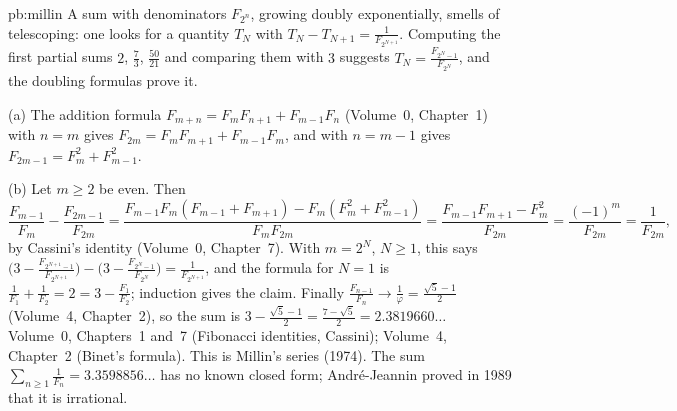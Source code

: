 \begin{solution}{pb:millin}
\idea A sum with denominators $F_{2^n}$, growing doubly exponentially, smells of telescoping: one looks for a quantity $T_N$
with $T_N-T_{N+1}=\frac1{F_{2^{N+1}}}$. Computing the first partial sums $2$, $\frac73$, $\frac{50}{21}$ and comparing them
with $3$ suggests $T_N=\frac{F_{2^N-1}}{F_{2^N}}$, and the doubling formulas prove it.

\writeup (a) The addition formula $F_{m+n}=F_mF_{n+1}+F_{m-1}F_n$ (Volume~0, Chapter~1) with $n=m$ gives
$F_{2m}=F_mF_{m+1}+F_{m-1}F_m$, and with $n=m-1$ gives $F_{2m-1}=F_m^2+F_{m-1}^2$.

(b) Let $m\ge2$ be even. Then
\[
\frac{F_{m-1}}{F_m}-\frac{F_{2m-1}}{F_{2m}}=\frac{F_{m-1}F_m(F_{m-1}+F_{m+1})-F_m(F_m^2+F_{m-1}^2)}{F_mF_{2m}}
=\frac{F_{m-1}F_{m+1}-F_m^2}{F_{2m}}=\frac{(-1)^m}{F_{2m}}=\frac1{F_{2m}},
\]
by Cassini's identity (Volume~0, Chapter~7). With $m=2^N$, $N\ge1$, this says $\bigl(3-\frac{F_{2^{N+1}-1}}{F_{2^{N+1}}}\bigr)-
\bigl(3-\frac{F_{2^N-1}}{F_{2^N}}\bigr)=\frac1{F_{2^{N+1}}}$, and the formula for $N=1$ is
$\frac1{F_1}+\frac1{F_2}=2=3-\frac{F_1}{F_2}$; induction gives the claim. Finally $\frac{F_{n-1}}{F_n}\to\frac1\varphi=
\frac{\sqrt5-1}2$ (Volume~4, Chapter~2), so the sum is $3-\frac{\sqrt5-1}2=\frac{7-\sqrt5}2=2.3819660\ldots$
\tools Volume~0, Chapters~1 and~7 (Fibonacci identities, Cassini); Volume~4, Chapter~2 (Binet's formula).
\leads This is Millin's series (1974). The sum $\sum_{n\ge1}\frac1{F_n}=3.3598856\ldots$ has no known closed form; André-Jeannin
proved in 1989 that it is irrational.
\end{solution}

